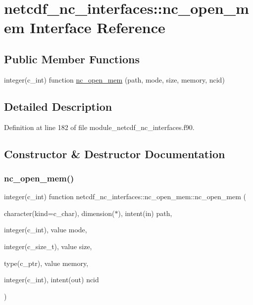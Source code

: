 \hypertarget{interfacenetcdf__nc__interfaces_1_1nc__open__mem}{}\section{netcdf\+\_\+nc\+\_\+interfaces\+:\+:nc\+\_\+open\+\_\+mem Interface Reference}
\label{interfacenetcdf__nc__interfaces_1_1nc__open__mem}
\subsection*{Public Member Functions}
\begin{DoxyCompactItemize}
\item 
integer(c\+\_\+int) function \hyperlink{interfacenetcdf__nc__interfaces_1_1nc__open__mem_a34c0db283530d10601867b3cc34c1c20}{nc\+\_\+open\+\_\+mem} (path, mode, size, memory, ncid)
\end{DoxyCompactItemize}


\subsection{Detailed Description}


Definition at line 182 of file module\+\_\+netcdf\+\_\+nc\+\_\+interfaces.\+f90.



\subsection{Constructor \& Destructor Documentation}
\mbox{\label{interfacenetcdf__nc__interfaces_1_1nc__open__mem_a34c0db283530d10601867b3cc34c1c20}} 
\subsubsection{\texorpdfstring{nc\+\_\+open\+\_\+mem()}{nc\_open\_mem()}}
{\footnotesize\ttfamily integer(c\+\_\+int) function netcdf\+\_\+nc\+\_\+interfaces\+::nc\+\_\+open\+\_\+mem\+::nc\+\_\+open\+\_\+mem (\begin{DoxyParamCaption}\item[{character(kind=c\+\_\+char), dimension($\ast$), intent(in)}]{path,  }\item[{integer(c\+\_\+int), value}]{mode,  }\item[{integer(c\+\_\+size\+\_\+t), value}]{size,  }\item[{type(c\+\_\+ptr), value}]{memory,  }\item[{integer(c\+\_\+int), intent(out)}]{ncid }\end{DoxyParamCaption})}



